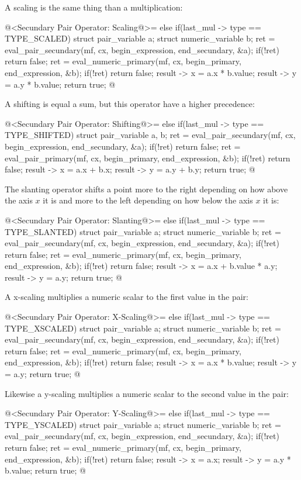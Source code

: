 A scaling is the same thing than a multiplication:

\iniciocodigo
@<Secundary Pair Operator: Scaling@>=
else if(last_mul -> type == TYPE_SCALED){
  struct pair_variable a;
  struct numeric_variable b;
  ret = eval_pair_secundary(mf, cx, begin_expression, end_secundary, &a);
  if(!ret)
    return false;
  ret = eval_numeric_primary(mf, cx, begin_primary, end_expression, &b);
  if(!ret)
    return false;
  result -> x = a.x * b.value;
  result -> y = a.y * b.value;
  return true;
}
@
\fimcodigo

A shifting is equal a sum, but this operator have a higher precedence:

\iniciocodigo
@<Secundary Pair Operator: Shifting@>=
else if(last_mul -> type == TYPE_SHIFTED){
  struct pair_variable a, b;
  ret = eval_pair_secundary(mf, cx, begin_expression, end_secundary, &a);
  if(!ret)
    return false;
  ret = eval_pair_primary(mf, cx, begin_primary, end_expression, &b);
  if(!ret)
    return false;
  result -> x = a.x + b.x;
  result -> y = a.y + b.y;
  return true;
}
@
\fimcodigo

The slanting operator shifts a point more to the right depending on
how above the axis $x$ it is and more to the left depending on how
below the axis $x$ it is:

\iniciocodigo
@<Secundary Pair Operator: Slanting@>=
else if(last_mul -> type == TYPE_SLANTED){
  struct pair_variable a;
  struct numeric_variable b;
  ret = eval_pair_secundary(mf, cx, begin_expression, end_secundary, &a);
  if(!ret)
    return false;
  ret = eval_numeric_primary(mf, cx, begin_primary, end_expression, &b);
  if(!ret)
    return false;
  result -> x = a.x + b.value * a.y;
  result -> y = a.y;
  return true;
}
@
\fimcodigo

A x-scaling multiplies a numeric scalar to the first value in the
pair:

\iniciocodigo
@<Secundary Pair Operator: X-Scaling@>=
else if(last_mul -> type == TYPE_XSCALED){
  struct pair_variable a;
  struct numeric_variable b;
  ret = eval_pair_secundary(mf, cx, begin_expression, end_secundary, &a);
  if(!ret)
    return false;
  ret = eval_numeric_primary(mf, cx, begin_primary, end_expression, &b);
  if(!ret)
    return false;
  result -> x = a.x * b.value;
  result -> y = a.y;
  return true;
}
@
\fimcodigo

Likewise a y-scaling multiplies a numeric scalar to the second value
in the pair:

\iniciocodigo
@<Secundary Pair Operator: Y-Scaling@>=
else if(last_mul -> type == TYPE_YSCALED){
  struct pair_variable a;
  struct numeric_variable b;
  ret = eval_pair_secundary(mf, cx, begin_expression, end_secundary, &a);
  if(!ret)
    return false;
  ret = eval_numeric_primary(mf, cx, begin_primary, end_expression, &b);
  if(!ret)
    return false;
  result -> x = a.x;
  result -> y = a.y * b.value;
  return true;
}
@
\fimcodigo

